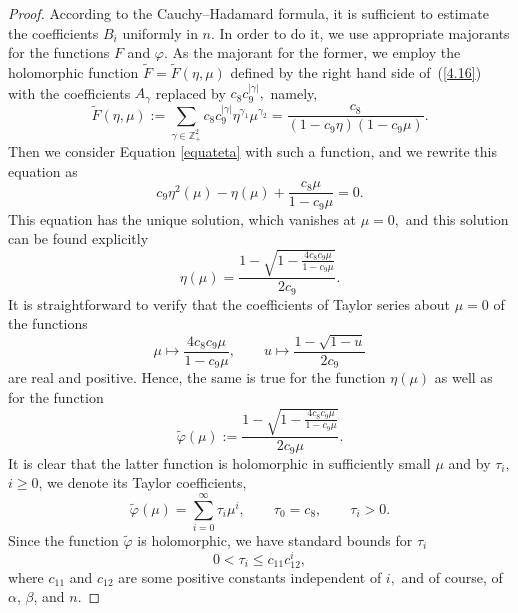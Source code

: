 \documentclass[10pt,a4paper]{amsart}
\def\g{\gamma}
\begin{document}
\begin{proof}
According to the Cauchy--Hadamard formula, it is sufficient to
estimate the coefficients $B_i$ uniformly in $n$. In order to do it, we use appropriate majorants for the functions
$F$ and $\varphi$. As the majorant for the former, we employ the holomorphic function
$\widetilde{F}=\widetilde{F}(\eta,\mu)$ defined
by the right hand side of~(\ref{4.16}) with the coefficients $A_\g$ replaced by $c_{8} c_{9}^{|\g|},$ namely,
\begin{equation*}
\widetilde{F}(\eta,\mu):=\sum\limits_{\gamma\in\mathds{Z}_+^2}
c_{8} c_{9}^{|\g|} \eta^{\gamma_1}\mu^{\gamma_2}=\frac{c_{8}}{(1-c_{9}\eta)(1-c_{9}\mu)}.
\end{equation*}
Then we consider   Equation \eqref{equateta} with such a function, and we rewrite this equation as
$$
c_{9}\eta^2(\mu)-\eta(\mu)+\frac{c_{8}\mu}{1-c_{9}\mu}=0.
$$
This equation has the unique solution, which vanishes at $\mu=0,$  and this solution can be found explicitly
$$
\eta(\mu)=\frac{1-\sqrt{1-\frac{4c_{8}c_{9}\mu}{1-c_{9}\mu} }}{2c_{9}}.
$$
It is straightforward to verify that the coefficients of    Taylor series about $\mu=0$ of the functions
\begin{equation*}
\mu\mapsto \frac{4c_{8}c_{9}\mu}{1-c_{9}\mu},\qquad u\mapsto \frac{1-\sqrt{1-u}}{2c_{9}}
\end{equation*}
are real and positive. Hence, the same is true for the function $\eta(\mu)$ as well as for
the function
$$
\widetilde{\varphi}(\mu):=\frac{1-\sqrt{1-\frac{4c_{8}c_{9}\mu}{1-c_{9}\mu}}}{2c_{9}\mu}.
$$
It is clear that the latter function is holomorphic in sufficiently small $\mu$ and by $\tau_i,$ $i\geqslant 0$, we denote its
Taylor coefficients,
\begin{equation*}
\widetilde{\varphi}(\mu)=\sum\limits_{i=0}^{\infty} \tau_i\mu^i,\qquad \tau_0=c_{8},\qquad \tau_i>0.
\end{equation*}
Since the function $\widetilde{\varphi}$ is holomorphic, we have standard bounds for $\tau_i$
\begin{equation*}%
0<\tau_i\leqslant c_{11} c_{12}^i,
\end{equation*}
where $c_{11}$ and $c_{12}$ are some positive constants independent of $i,$ and of course, of $\alpha$, $\beta$, and $n$.


\end{proof}
\end{document}
